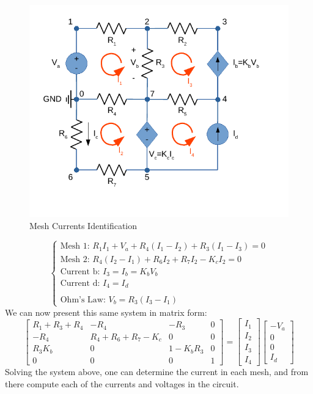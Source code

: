 \begin{figure}[h] \centering
  \includegraphics[width=0.7\linewidth]{MeshMethod.pdf}
  \caption{Mesh Currents Identification}
  \label{fig:MeshMethod}
\end{figure}

$$
\begin{cases}
  \text{Mesh 1: } R_{1}I_{1}+V_{a}+R_{4}(I_{1}-I_{2})+R_{3}(I_{1}-I_{3}) = 0\\
  \text{Mesh 2: } R_{4}(I_{2}-I_{1})+R_{6}I_{2}+R_{7}I_{2}-K_{c}I_{2} = 0\\
  \text{Current b: } I_{3} = I_{b} = K_{b}V_{b}\\
  \text{Current d: } I_{4} = I_{d}\\
  \\
  \text{Ohm's Law: } V_{b} = R_{3}(I_{3}-I_{1})
\end{cases}
$$
We can now present this same system in matrix form:
$$
\begin{bmatrix}
  R_{1}+R_{3}+R_{4} & -R_{4} & -R_{3} & 0 \\
  -R_{4} & R_{4}+R_{6}+R_{7}-K_{c} & 0 & 0\\
  R_{3}K_{b} & 0 & 1-K_{b}R_{3} & 0\\
  0 & 0 & 0 & 1
\end{bmatrix}
=
\begin{bmatrix}
  I_{1}\\
  I_{2}\\
  I_{3}\\
  I_{4}
\end{bmatrix}
\begin{bmatrix}
  -V_{a}\\
  0\\
  0\\
  I_{d}
\end{bmatrix}
$$
Solving the system above, one can determine the current in each mesh, and from there compute each of the currents and voltages in the circuit.


